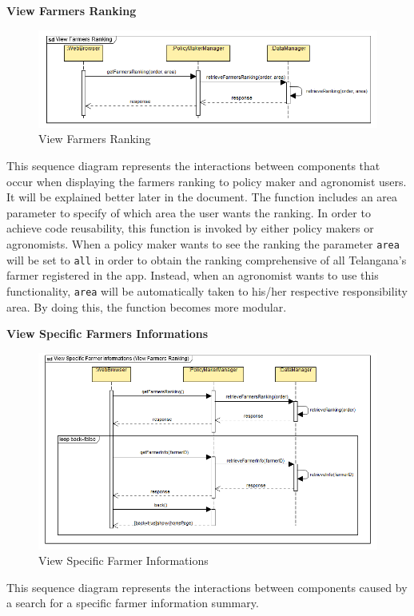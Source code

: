 \documentclass[table, 12pt]{article}
\begin{document}
\newpage
\textbf{View Farmers Ranking}
\begin{center}
    \begin{figure}[H]
        \includegraphics[scale=0.8, center]{assets/SequenceDiagram/ViewFarmersRanking.png}
        \caption{View Farmers Ranking}
        \label{fig: ranking}
    \end{figure}
\end{center}
This sequence diagram represents the interactions between components that occur when displaying the farmers ranking to policy maker and agronomist users.
It will be explained better later in the document. %
The function includes an area parameter to specify of which area the user wants the ranking.
In order to achieve code reusability, this function is invoked by either policy makers or agronomists. 
When a policy maker wants to see the ranking the parameter \texttt{area} will be set to \texttt{all} in order to obtain the ranking comprehensive of all Telangana's farmer registered in the app.
Instead, when an agronomist wants to use this functionality, \texttt{area} will be automatically taken to his/her respective responsibility area. By doing this, the function becomes more modular.

\newpage
\textbf{View Specific Farmers Informations}
\begin{center}
    \begin{figure}[H]
        \includegraphics[scale=0.8, center]{assets/SequenceDiagram/ViewSpecificFarmerInformations.png}
        \caption{View Specific Farmer Informations}
        \label{fig: specificFarmerInfo}
    \end{figure}
\end{center}
This sequence diagram represents the interactions between components caused by a search for a specific farmer information summary.
\end{document}
